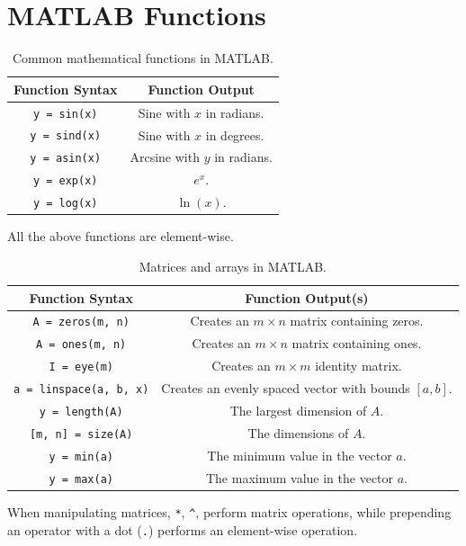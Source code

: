 \documentclass{article}
\begin{document}
\section{MATLAB Functions}
\begin{table}[H]
    \centering
    \begin{tabular}{c c}
        \toprule
        Function Syntax         & Function Output                \\
        \midrule
        \lstinline!y = sin(x)!  & Sine with \(x\) in radians.    \\
        \lstinline!y = sind(x)! & Sine with \(x\) in degrees.    \\
        \lstinline!y = asin(x)! & Arcsine with \(y\) in radians. \\
        \lstinline!y = exp(x)!  & \(e^x\).                       \\
        \lstinline!y = log(x)!  & \(\ln{\left( x \right)}\).     \\
        \bottomrule
    \end{tabular}
    \caption{Common mathematical functions in MATLAB.}
\end{table}
All the above functions are element-wise.
\begin{table}[H]
    \centering
    \begin{tabular}{c c}
        \toprule
        Function Syntax                   & Function Output(s)                                                 \\
        \midrule
        \lstinline!A = zeros(m, n)!       & Creates an \(m \times n\) matrix containing zeros.                 \\
        \lstinline!A = ones(m, n)!        & Creates an \(m \times n\) matrix containing ones.                  \\
        \lstinline!I = eye(m)!            & Creates an \(m \times m\) identity matrix.                         \\
        \lstinline!a = linspace(a, b, x)! & Creates an evenly spaced vector with bounds \(\left[a, b\right]\). \\
        \lstinline!y = length(A)!         & The largest dimension of \(A\).                                    \\
        \lstinline![m, n] = size(A)!      & The dimensions of \(A\).                                           \\
        \lstinline!y = min(a)!            & The minimum value in the vector \(a\).                             \\
        \lstinline!y = max(a)!            & The maximum value in the vector \(a\).                             \\
        \bottomrule
    \end{tabular}
    \caption{Matrices and arrays in MATLAB.}
\end{table}
When manipulating matrices, \verb!*!, \verb!^!, perform matrix operations, while prepending an operator with a dot (\verb!.!) performs an element-wise operation.
\end{document}
